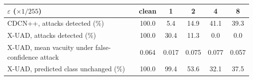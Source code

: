 \begin{tabular}{lccccc}
\toprule
$\varepsilon$ ($\times 1/255$) & clean & 1 & 2 & 4 & 8 \\
\midrule
CDCN++, attacks detected (\%) & 100.0 & 5.4 & 14.9 & 41.1 & 39.3 \\
X-UAD, attacks detected (\%) & 100.0 & 30.4 & 11.3 & 0.0 & 0.0 \\
\midrule
X-UAD, mean vacuity under false-confidence attack & 0.064 & 0.017 & 0.075 & 0.077 & 0.057 \\
X-UAD, predicted class unchanged (\%) & 100.0 & 99.4 & 53.6 & 32.1 & 37.5 \\
\bottomrule
\end{tabular}